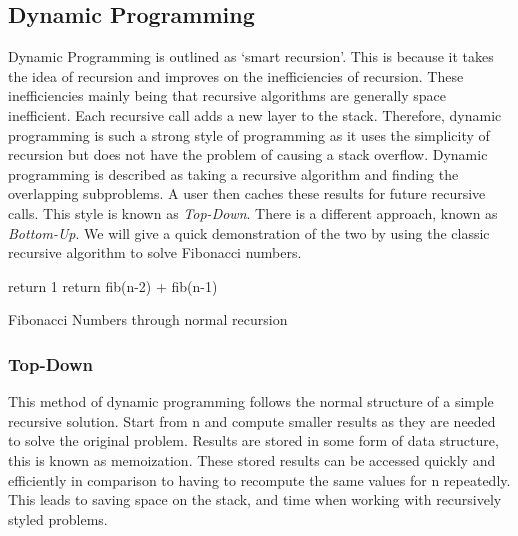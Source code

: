 \documentclass[10pt,twocolumn]{IEEEtran}
\begin{document}
\subsection{Dynamic Programming}
Dynamic Programming is outlined as `smart recursion'. This is because it takes the idea of recursion and improves on the inefficiencies of recursion. These inefficiencies mainly being that recursive algorithms are generally space inefficient. Each recursive call adds a new layer to the stack. Therefore, dynamic programming is such a strong style of programming as it uses the simplicity of recursion but does not have the problem of causing a stack overflow. Dynamic programming  is described as taking a recursive algorithm and finding the overlapping subproblems. A user then caches these results for future recursive calls.
This style is known as \textit{Top-Down}. There is a different approach, known as \textit{Bottom-Up}. We will give a quick demonstration of the two by using the classic recursive algorithm to solve Fibonacci numbers.
\IncMargin{1em}
	\begin{algorithm}
		
		 {return 1\;}
		return fib(n-2) + fib(n-1)\;
			
	\caption{Fibonacci Numbers through normal recursion}
	\end{algorithm}
\DecMargin{1em}
	
	\subsubsection{Top-Down}
	This method of dynamic programming follows the normal structure of a simple recursive solution. Start from n and compute smaller results as they are needed to solve the original problem. Results are stored in some form of data structure, this is known as memoization. These stored results can be accessed quickly and efficiently in comparison to having to recompute the same values for n repeatedly. This leads to saving space on the stack, and time when working with recursively styled problems. 
	
\end{document}
